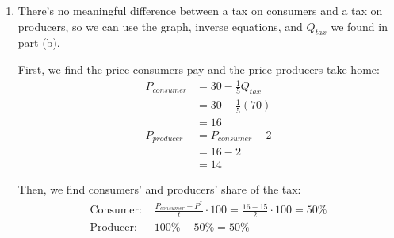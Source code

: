 \documentclass{article}
\begin{document}
\begin{enumerate}
\begin{enumerate}
		 Invert supply and demand:
		\begin{align*}
		Q_D &= 150 - 5P \\
		5P &= 150 - Q_D \\
		P &= 30 - \frac{1}{5}Q_D \\
		\\
		Q_S &= 5P \\
		P &= \frac{1}{5}Q_S
		\end{align*}
		Find new supply curve by translating the original up by 2:
		\begin{equation*}
		P = \frac{1}{5}Q_S + 2
		\end{equation*}
		Find new equilibrium quantity:
		\begin{align*}
		30 - \frac{1}{5}Q &= \frac{1}{5}Q + 2 \\
		28 &= \frac{2}{5}Q \\
		70 &= Q_{tax}
		\end{align*}
		Find change in quantity:
		\begin{equation*}
		\Delta Q = Q_{tax} - Q^* = 70 - 75 = -5
		\end{equation*}
		
	\item There's no meaningful difference between a tax on consumers and a tax on producers, so we can use the graph, inverse equations, and $Q_{tax}$ we found in part (b).
	
		First, we find the price consumers pay and the price producers take home:
		\begin{align*}
		P_{consumer} &= 30 - \frac{1}{5}Q_{tax} \\
		&= 30 - \frac{1}{5}(70) \\
		&= 16 \\
		P_{producer} &= P_{consumer} - 2 \\
		&= 16 - 2 \\
		&= 14
		\end{align*}
		
		Then, we find consumers' and producers' share of the tax:
		\begin{align*}
		\text{Consumer: }& \frac{P_{consumer} - P^*}{t} \cdot 100 = \frac{16 - 15}{2} \cdot 100 = 50\% \\
		\text{Producer: }& 100\% - 50\% = 50\%
		\end{align*}
	
	\end{enumerate}
	

\end{enumerate}
\end{document}
